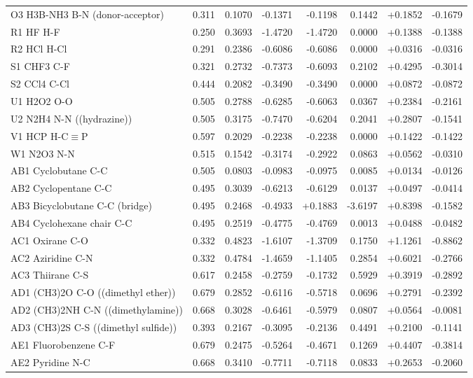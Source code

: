 \documentclass[11pt,a4paper]{article}
\begin{document}
\begin{longtable}{p{4.5cm}rrrrrrr}
O3 H3B-NH3 B-N (donor-acceptor) & 0.311 & 0.1070 & -0.1371 & -0.1198 & 0.1442 & +0.1852 & -0.1679\\
R1 HF H-F & 0.250 & 0.3693 & -1.4720 & -1.4720 & 0.0000 & +0.1388 & -0.1388\\
R2 HCl H-Cl & 0.291 & 0.2386 & -0.6086 & -0.6086 & 0.0000 & +0.0316 & -0.0316\\
S1 CHF3 C-F & 0.321 & 0.2732 & -0.7373 & -0.6093 & 0.2102 & +0.4295 & -0.3014\\
S2 CCl4 C-Cl & 0.444 & 0.2082 & -0.3490 & -0.3490 & 0.0000 & +0.0872 & -0.0872\\
U1 H2O2 O-O & 0.505 & 0.2788 & -0.6285 & -0.6063 & 0.0367 & +0.2384 & -0.2161\\
U2 N2H4 N-N ((hydrazine)) & 0.505 & 0.3175 & -0.7470 & -0.6204 & 0.2041 & +0.2807 & -0.1541\\
V1 HCP H-C$\equiv$P & 0.597 & 0.2029 & -0.2238 & -0.2238 & 0.0000 & +0.1422 & -0.1422\\
W1 N2O3 N-N & 0.515 & 0.1542 & -0.3174 & -0.2922 & 0.0863 & +0.0562 & -0.0310\\
AB1 Cyclobutane C-C & 0.505 & 0.0803 & -0.0983 & -0.0975 & 0.0085 & +0.0134 & -0.0126\\
AB2 Cyclopentane C-C & 0.495 & 0.3039 & -0.6213 & -0.6129 & 0.0137 & +0.0497 & -0.0414\\
AB3 Bicyclobutane C-C (bridge) & 0.495 & 0.2468 & -0.4933 & +0.1883 & -3.6197 & +0.8398 & -0.1582\\
AB4 Cyclohexane chair C-C & 0.495 & 0.2519 & -0.4775 & -0.4769 & 0.0013 & +0.0488 & -0.0482\\
AC1 Oxirane C-O & 0.332 & 0.4823 & -1.6107 & -1.3709 & 0.1750 & +1.1261 & -0.8862\\
AC2 Aziridine C-N & 0.332 & 0.4784 & -1.4659 & -1.1405 & 0.2854 & +0.6021 & -0.2766\\
AC3 Thiirane C-S & 0.617 & 0.2458 & -0.2759 & -0.1732 & 0.5929 & +0.3919 & -0.2892\\
AD1 (CH3)2O C-O ((dimethyl ether)) & 0.679 & 0.2852 & -0.6116 & -0.5718 & 0.0696 & +0.2791 & -0.2392\\
AD2 (CH3)2NH C-N ((dimethylamine)) & 0.668 & 0.3028 & -0.6461 & -0.5979 & 0.0807 & +0.0564 & -0.0081\\
AD3 (CH3)2S C-S ((dimethyl sulfide)) & 0.393 & 0.2167 & -0.3095 & -0.2136 & 0.4491 & +0.2100 & -0.1141\\
AE1 Fluorobenzene C-F & 0.679 & 0.2475 & -0.5264 & -0.4671 & 0.1269 & +0.4407 & -0.3814\\
AE2 Pyridine N-C & 0.668 & 0.3410 & -0.7711 & -0.7118 & 0.0833 & +0.2653 & -0.2060\\

\end{longtable}
\end{document}
